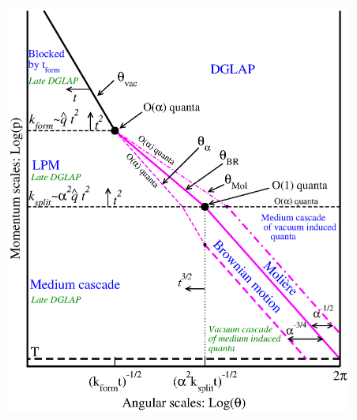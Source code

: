\begin{figure}[tb]
\centering
\begin{subfigure}{0.48\textwidth}
\includegraphics[width=0.99\textwidth]{figures/regions4.eps}

\end{subfigure}
\end{figure}
